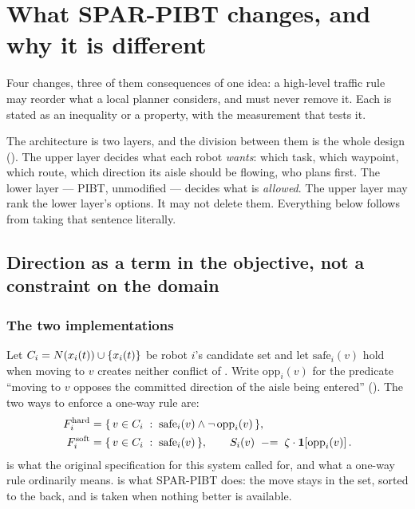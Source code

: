 \section{What SPAR-PIBT changes, and why it is different}
\label{sec:contribution}

\begin{lede}
Four changes, three of them consequences of one idea: a high-level traffic
rule may reorder what a local planner considers, and must never remove it.
Each is stated as an inequality or a property, with the measurement that tests
it.
\end{lede}

The architecture is two layers, and the division between them is the whole
design (). The upper layer decides what each robot
\emph{wants}: which task, which waypoint, which route, which direction its
aisle should be flowing, who plans first. The lower layer --- PIBT, unmodified
--- decides what is \emph{allowed}. The upper layer may rank the lower layer's
options. It may not delete them. Everything below follows from taking that
sentence literally.

\subsection{Direction as a term in the objective, not a constraint on the domain}
\label{sec:contribution-soft}

\subsubsection{The two implementations}

Let $C_i = N(x_{i}(t)) \cup \{x_{i}(t)\}$ be robot $i$'s candidate set and
let $\mathrm{safe}_i(v)$ hold when moving to $v$ creates neither conflict of
. Write
$\mathrm{opp}_i(v)$ for the predicate ``moving to $v$ opposes the committed
direction of the aisle being entered'' (). The two
ways to enforce a one-way rule are:
\begin{align}
  F^{\mathrm{hard}}_i &= \{\, v \in C_i \;:\; \mathrm{safe}_i(v) \wedge \neg\,\mathrm{opp}_i(v) \,\},
  \label{eq:hard}\\
  F^{\mathrm{soft}}_i &= \{\, v \in C_i \;:\; \mathrm{safe}_i(v) \,\},
  \qquad
  S_i(v) \;\mathrel{-}=\; \zeta \cdot \mathbf{1}\!\left[\mathrm{opp}_i(v)\right].
  \label{eq:soft}
\end{align}
 is what the original specification for this system called for,
and what a one-way rule ordinarily means.  is what SPAR-PIBT
does: the move stays in the set, sorted to the back, and is taken when nothing
better is available.

